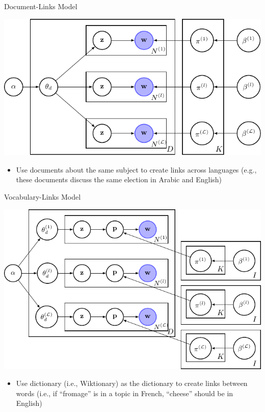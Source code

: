 \documentclass[compress]{beamer}
\begin{document}
	\begin{frame}{Document-Links Model}
		\begin{center}
			\includegraphics[height=0.4\textheight]{multilingual_itm/polylingual-new.pdf}
		\end{center}
		\begin{itemize}
			\item Use documents about the same subject to
                          create links across languages (e.g., these
                          documents discuss the same election in
                          Arabic and English)
		\end{itemize}
	\end{frame}
	\begin{frame}{Vocabulary-Links Model}
		\begin{center}
			\includegraphics[height=0.4\textheight]{multilingual_itm/treeprior.pdf}
		\end{center}
		\begin{itemize}
		\item Use dictionary (i.e., Wiktionary) as the
                  dictionary to create links between words (i.e., if
                  ``fromage'' is in a topic in French, ``cheese''
                  should be in English)
	\end{itemize}
	\end{frame}
\end{document}
